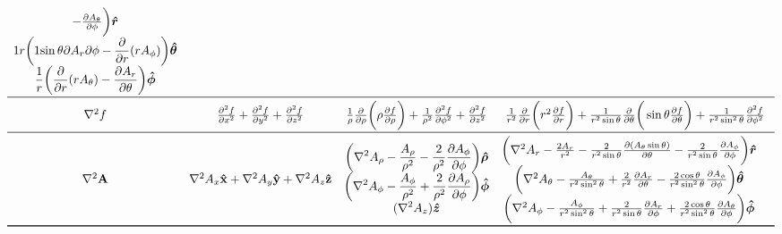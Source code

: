 \documentclass[a4paper]{scrarticle}
\begin{document}
\begin{sidewaystable}
\[\begin{array}{cccc}
\begin{matrix}
    - \frac{\partial A_\theta }{ \partial \phi} \bigg ) \boldsymbol{\hat r} \\
    \displaystyle{1 }{ r} \bigg ({1 }{ \sin\theta}{\partial A_r }{ \partial \phi}
    - \frac{\partial }{ \partial r} ( r A_\phi ) \bigg ) \boldsymbol{\hat \theta}\\
    \displaystyle \frac{1 }{ r}\bigg (\frac{\partial }{ \partial r} ( r A_\theta )
    - \frac{\partial A_r }{ \partial \theta} \bigg) \boldsymbol{\hat \phi}
\end{matrix}
\\
\midrule
\nabla^2 f &
    \frac{\partial^2 f }{ \partial x^2} + \frac{\partial^2 f }{ \partial y^2} + \frac{\partial^2 f }{ \partial z^2}&
    \frac{1 }{ \rho}\frac{\partial }{ \partial \rho} \bigg (\rho \frac{\partial f }{ \partial \rho} \bigg )
    + \frac{1 }{ \rho^2}\frac{\partial^2 f }{ \partial \phi^2}
    + \frac{\partial^2 f }{ \partial z^2}
    &
    \frac{1 }{ r^2}\frac{\partial }{ \partial r} \bigg (r^2 \frac{\partial f }{ \partial r} \bigg)
    + \frac{1 }{ r^2\sin\theta}\frac{\partial }{ \partial \theta} \bigg(\sin\theta \frac{\partial f }{ \partial \theta} \bigg)
    + \frac{1 }{ r^2\sin^2\theta}\frac{\partial^2 f }{ \partial \phi^2}\\
\midrule
\nabla^2 \mathbf{A} &
    \nabla^2 A_x \mathbf{\hat x} + \nabla^2 A_y \mathbf{\hat y} + \nabla^2 A_z \mathbf{\hat z} & 
\begin{matrix}
    \displaystyle \bigg (\nabla^2 A_\rho - \frac{A_\rho }{ \rho^2}
    - \frac{2 }{ \rho^2}\frac{\partial A_\phi }{ \partial \phi} \bigg) \boldsymbol{\hat\rho}\\
    \displaystyle \bigg (\nabla^2 A_\phi - \frac{A_\phi }{ \rho^2}
    + \frac{2 }{ \rho^2}\frac{\partial A_\rho }{ \partial \phi} \bigg ) \boldsymbol{\hat\phi}\\
    \displaystyle (\nabla^2 A_z ) \boldsymbol{\hat z}
\end{matrix} & 
\begin{matrix}
    \bigg (\nabla^2 A_r - \frac{2 A_r }{ r^2}
    - \frac{2 }{ r^2\sin\theta}\frac{\partial (A_\theta \sin\theta) }{ \partial\theta}
    - \frac{2 }{ r^2\sin\theta}\frac{\partial A_\phi }{ \partial \phi} \bigg ) \boldsymbol{\hat r}\\
    \bigg (\nabla^2 A_\theta - \frac{A_\theta }{ r^2\sin^2\theta}
    + \frac{2 }{ r^2}\frac{\partial A_r }{ \partial \theta}
    - \frac{2 \cos\theta }{ r^2\sin^2\theta}\frac{\partial A_\phi }{ \partial \phi} \bigg ) \boldsymbol{\hat\theta}\\
    \bigg (\nabla^2 A_\phi - \frac{A_\phi }{ r^2\sin^2\theta}
    + \frac{2 }{ r^2\sin\theta}\pdv{ A_r }{  \phi}
    + \frac{2 \cos\theta }{ r^2\sin^2\theta}\frac{\partial A_\theta }{ \partial \phi} \bigg ) \boldsymbol{\hat\phi} & 
\end{matrix}
\\ \bottomrule
\end{array}
\]
\end{sidewaystable}
\end{document}

